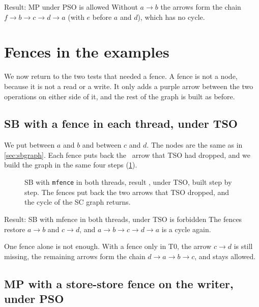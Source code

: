 \begin{resultbox}{Result: MP  under PSO is allowed}
Without $a \to b$ the arrows form the chain $f \to b \to c \to d \to a$ (with $e$ before $a$ and $d$), which has no cycle.
\end{resultbox}

\section{Fences in the examples}
\label{sec:fences}

We now return to the two tests that needed a fence. A fence is not a node, because it is not a read or a write. It only adds a purple arrow between the two operations on either side of it, and the rest of the graph is built as before.

\subsection{SB with a fence in each thread, under TSO}

We put  between $a$ and $b$ and between $c$ and $d$. The nodes are the same as in \cref{sec:sbgraph}. Each fence puts back the \WR\ arrow that TSO had dropped, and we build the graph in the same four steps (\cref{fig:sbfence}).

\begin{figure}[H]
\centering
{}
\caption{SB with \texttt{mfence} in both threads, result , under TSO, built step by step. The fences put back the two arrows that TSO dropped, and the cycle of the SC graph returns.}
\label{fig:sbfence}
\end{figure}

\begin{forbidbox}{Result: SB with mfence in both threads,  under TSO is forbidden}
The fences restore $a \to b$ and $c \to d$, and $a \to b \to c \to d \to a$ is a cycle again.
\end{forbidbox}

One fence alone is not enough. With a fence only in T0, the arrow $c \to d$ is still missing, the remaining arrows form the chain $d \to a \to b \to c$, and  stays allowed.

\subsection{MP with a store-store fence on the writer, under PSO}

